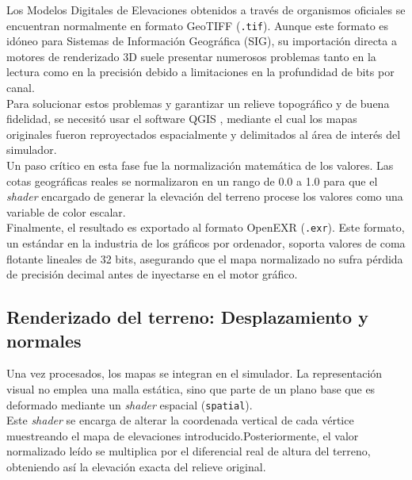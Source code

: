         Los Modelos Digitales de Elevaciones obtenidos a través de organismos oficiales se encuentran normalmente en formato GeoTIFF (\texttt{.tif}). Aunque este formato es idóneo para Sistemas de Información Geográfica (SIG), su importación directa a motores de renderizado 3D suele presentar numerosos problemas tanto en la lectura como en la precisión debido a limitaciones en la profundidad de bits por canal.\\

        Para solucionar estos problemas y garantizar un relieve topográfico y de buena fidelidad, se necesitó usar el software QGIS \cite{qgis_software}, mediante el cual los mapas originales fueron reproyectados espacialmente y delimitados al área de interés del simulador.\\ 

        Un paso crítico en esta fase fue la normalización matemática de los valores. Las cotas geográficas reales se normalizaron en un rango de 0.0 a 1.0  para que el \textit{shader} encargado de generar la elevación del terreno procese los valores como una variable de color escalar. \\

        Finalmente, el resultado es exportado al formato OpenEXR (\texttt{.exr}). Este formato, un estándar en la industria de los gráficos por ordenador, soporta valores de coma flotante lineales de 32 bits, asegurando que el mapa normalizado no sufra pérdida de precisión decimal antes de inyectarse en el motor gráfico.

    \subsection[Renderizado del terreno]{Renderizado del terreno: Desplazamiento y normales}

        Una vez procesados, los mapas se integran en el simulador. La representación visual no emplea una malla estática, sino que parte de un plano base que es deformado mediante un \textit{shader} espacial (\texttt{spatial})\cite{escudero2023}.\\

        Este \textit{shader} se encarga de alterar la coordenada vertical de cada vértice muestreando el mapa de elevaciones introducido.Posteriormente, el valor normalizado leído se multiplica por el diferencial real de altura del terreno, obteniendo así la elevación exacta del relieve original.\cite{heightmap}\\

